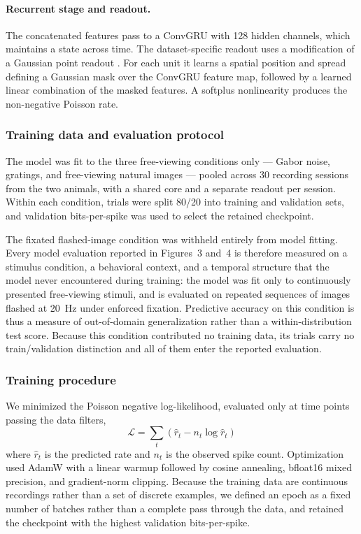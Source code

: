 \documentclass{lite}
\begin{document}
\paragraph{Recurrent stage and readout.} The concatenated features pass to a ConvGRU \cite{ballas2015delving} with 128 hidden channels, which maintains a state across time. The dataset-specific readout uses a modification of a Gaussian point readout \cite{lurz2020generalization}. For each unit it learns a spatial position and spread defining a Gaussian mask over the ConvGRU feature map, followed by a learned linear combination of the masked features. A softplus nonlinearity produces the non-negative Poisson rate.

\subsubsection{Training data and evaluation protocol}
The model was fit to the three free-viewing conditions only --- Gabor noise, gratings, and free-viewing natural images --- pooled across 30 recording sessions from the two animals, with a shared core and a separate readout per session. Within each condition, trials were split 80/20 into training and validation sets, and validation bits-per-spike was used to select the retained checkpoint.

The fixated flashed-image condition was withheld entirely from model fitting. Every model evaluation reported in Figures~3 and~4 is therefore measured on a stimulus condition, a behavioral context, and a temporal structure that the model never encountered during training: the model was fit only to continuously presented free-viewing stimuli, and is evaluated on repeated sequences of images flashed at 20~Hz under enforced fixation. Predictive accuracy on this condition is thus a measure of out-of-domain generalization rather than a within-distribution test score. Because this condition contributed no training data, its trials carry no train/validation distinction and all of them enter the reported evaluation.

\subsubsection{Training procedure}
We minimized the Poisson negative log-likelihood, evaluated only at time points passing the data filters,
\begin{equation}
    \mathcal{L} = \sum_{t} \left( \hat{r}_t - n_t \log \hat{r}_t \right)
\end{equation}
where $\hat{r}_t$ is the predicted rate and $n_t$ is the observed spike count. Optimization used AdamW with a linear warmup followed by cosine annealing, bfloat16 mixed precision, and gradient-norm clipping. Because the training data are continuous recordings rather than a set of discrete examples, we defined an epoch as a fixed number of batches rather than a complete pass through the data, and retained the checkpoint with the highest validation bits-per-spike.
\end{document}
